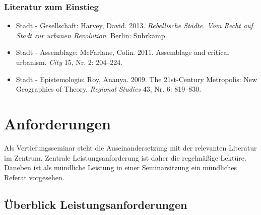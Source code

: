 \documentclass[
]{article}
\providecommand{\tightlist}{%
  \setlength{\itemsep}{0pt}\setlength{\parskip}{0pt}}
\begin{document}
\hypertarget{literatur-zum-einstieg}{%
\subsubsection*{Literatur zum Einstieg}\label{literatur-zum-einstieg}}

\begin{itemize}
\tightlist
\item
  Stadt - Gesellschaft: Harvey, David. 2013. \emph{Rebellische Städte. Vom Recht auf Stadt zur urbanen Revolution}. Berlin: Suhrkamp.
\item
  Stadt - Assemblage: McFarlane, Colin. 2011. Assemblage and critical urbanism. \emph{City} 15, Nr. 2: 204--224.
\item
  Stadt - Epistemologie: Roy, Ananya. 2009. The 21st-Century Metropolis: New Geographies of Theory. \emph{Regional Studies} 43, Nr. 6: 819--830.
\end{itemize}

\hypertarget{anforderungen}{%
\section*{Anforderungen}\label{anforderungen}}

Als Vertiefungsseminar steht die Auseinandersetzung mit der relevanten Literatur im Zentrum. Zentrale Leistungsanforderung ist daher die regelmäßige Lektüre. Daneben ist als mündliche Leistung in einer Seminarsitzung ein mündliches Referat vorgesehen.

\hypertarget{uxfcberblick-leistungsanforderungen}{%
\subsection*{Überblick Leistungsanforderungen}\label{uxfcberblick-leistungsanforderungen}}
\end{document}
